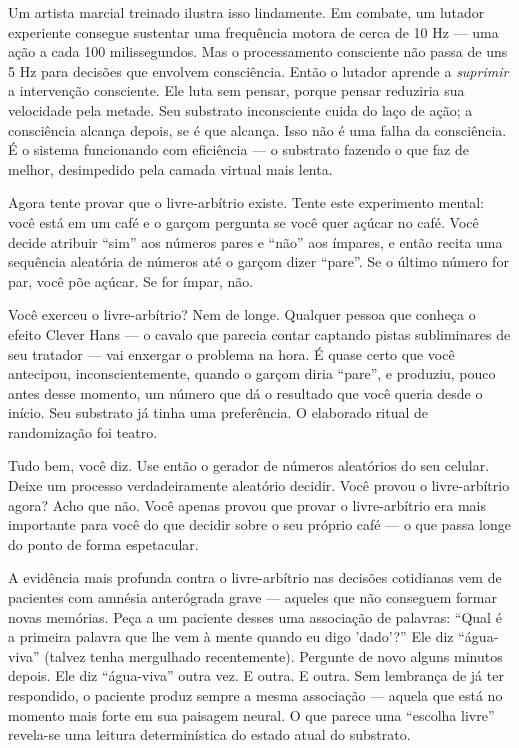 \documentclass[11pt, twoside, openright]{book}
\begin{document}
Um artista marcial treinado ilustra isso lindamente. Em combate, um lutador experiente consegue sustentar uma frequência motora de cerca de 10 Hz --- uma ação a cada 100 milissegundos. Mas o processamento consciente não passa de uns 5 Hz para decisões que envolvem consciência. Então o lutador aprende a \textit{suprimir} a intervenção consciente. Ele luta sem pensar, porque pensar reduziria sua velocidade pela metade. Seu substrato inconsciente cuida do laço de ação; a consciência alcança depois, se é que alcança. Isso não é uma falha da consciência. É o sistema funcionando com eficiência --- o substrato fazendo o que faz de melhor, desimpedido pela camada virtual mais lenta.

Agora tente provar que o livre-arbítrio existe. Tente este experimento mental: você está em um café e o garçom pergunta se você quer açúcar no café. Você decide atribuir ``sim'' aos números pares e ``não'' aos ímpares, e então recita uma sequência aleatória de números até o garçom dizer ``pare''. Se o último número for par, você põe açúcar. Se for ímpar, não.

Você exerceu o livre-arbítrio? Nem de longe. Qualquer pessoa que conheça o efeito Clever Hans --- o cavalo que parecia contar captando pistas subliminares de seu tratador --- vai enxergar o problema na hora. É quase certo que você antecipou, inconscientemente, quando o garçom diria ``pare'', e produziu, pouco antes desse momento, um número que dá o resultado que você queria desde o início. Seu substrato já tinha uma preferência. O elaborado ritual de randomização foi teatro.

Tudo bem, você diz. Use então o gerador de números aleatórios do seu celular. Deixe um processo verdadeiramente aleatório decidir. Você provou o livre-arbítrio agora? Acho que não. Você apenas provou que provar o livre-arbítrio era mais importante para você do que decidir sobre o seu próprio café --- o que passa longe do ponto de forma espetacular.

A evidência mais profunda contra o livre-arbítrio nas decisões cotidianas vem de pacientes com amnésia anterógrada grave --- aqueles que não conseguem formar novas memórias. Peça a um paciente desses uma associação de palavras: ``Qual é a primeira palavra que lhe vem à mente quando eu digo 'dado'?'' Ele diz ``água-viva'' (talvez tenha mergulhado recentemente). Pergunte de novo alguns minutos depois. Ele diz ``água-viva'' outra vez. E outra. E outra. Sem lembrança de já ter respondido, o paciente produz sempre a mesma associação --- aquela que está no momento mais forte em sua paisagem neural. O que parece uma ``escolha livre'' revela-se uma leitura determinística do estado atual do substrato.
\end{document}
